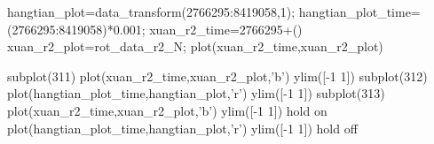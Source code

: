 hangtian_plot=data_transform(2766295:8419058,1);
hangtian_plot_time=(2766295:8419058)*0.001;
xuan_r2_time=2766295+()
xuan_r2_plot=rot_data_r2_N;
plot(xuan_r2_time,xuan_r2_plot)



subplot(311)
plot(xuan_r2_time,xuan_r2_plot,'b')
ylim([-1 1])
subplot(312)
plot(hangtian_plot_time,hangtian_plot,'r')
ylim([-1 1])
subplot(313)
plot(xuan_r2_time,xuan_r2_plot,'b')
ylim([-1 1])
hold on
plot(hangtian_plot_time,hangtian_plot,'r')
ylim([-1 1])
hold off